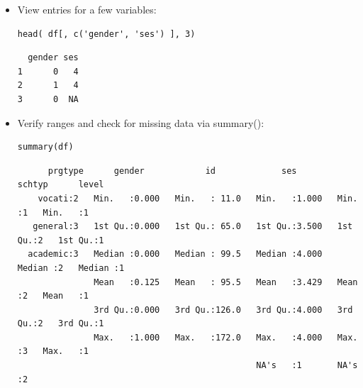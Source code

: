 \begin{frame}
\begin{itemize}
{\tiny
\begin{verbatim}
[1] 0 1 0 0 0 0 # OR

  gender
1      0
2      1
3      0
4      0
5      0
6      0
7      0
8      0
\end{verbatim}	
}

\newpage	
		\item View entries for a few variables:
\begin{lstlisting}
head( df[, c('gender', 'ses') ], 3) 
\end{lstlisting}		

\begin{verbatim}
  gender ses
1      0   4
2      1   4
3      0  NA
\end{verbatim}

\newpage
		\item Verify ranges and check for missing data via \ttfamily summary(): \normalfont 
\begin{lstlisting}
summary(df)
\end{lstlisting}

{ \tiny
	\begin{verbatim}
      prgtype      gender            id             ses            schtyp      level  
    vocati:2   Min.   :0.000   Min.   : 11.0   Min.   :1.000   Min.   :1   Min.   :1  
   general:3   1st Qu.:0.000   1st Qu.: 65.0   1st Qu.:3.500   1st Qu.:2   1st Qu.:1  
  academic:3   Median :0.000   Median : 99.5   Median :4.000   Median :2   Median :1  
               Mean   :0.125   Mean   : 95.5   Mean   :3.429   Mean   :2   Mean   :1  
               3rd Qu.:0.000   3rd Qu.:126.0   3rd Qu.:4.000   3rd Qu.:2   3rd Qu.:1  
               Max.   :1.000   Max.   :172.0   Max.   :4.000   Max.   :3   Max.   :1  
                                               NA's   :1       NA's   :2              
	\end{verbatim}	
}
	\end{itemize}
\end{frame}


